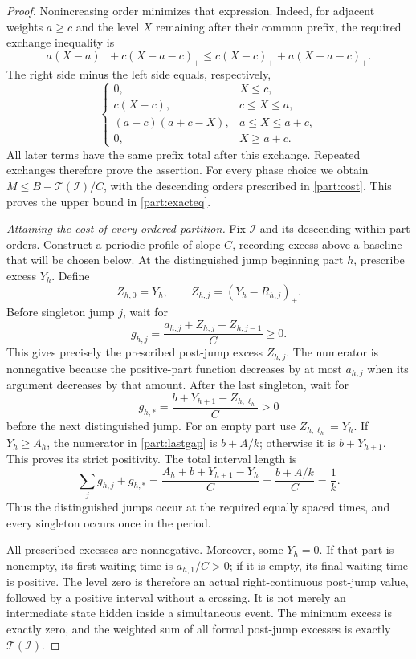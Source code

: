 \documentclass[11pt,a4paper]{article}
\theoremstyle{remark}\newtheorem{remark}[theorem]{Remark}
\begin{document}
\begin{proof}
Nonincreasing order minimizes that expression.  Indeed, for adjacent
weights $a\ge c$ and the level $X$ remaining after their common
prefix, the required exchange inequality is
\begin{equation}\label{part:exchange}
 a(X-a)_++c(X-a-c)_+
 \le c(X-c)_++a(X-a-c)_+.
\end{equation}
The right side minus the left side equals, respectively,
\[
 \begin{cases}
 0,&X\le c,\\
 c(X-c),&c\le X\le a,\\
 (a-c)(a+c-X),&a\le X\le a+c,\\
 0,&X\ge a+c.
 \end{cases}
\]
All later terms have the same prefix total after this exchange.
Repeated exchanges therefore prove the assertion.  For every phase
choice we obtain $M\le B-\mathcal T(\mathcal I)/C$, with the
descending orders prescribed in \eqref{part:cost}.  This proves
the upper bound in \eqref{part:exacteq}.

\emph{Attaining the cost of every ordered partition.}
Fix $\mathcal I$ and its descending within-part orders.  Construct a
periodic profile of slope $C$, recording excess above a baseline
that will be chosen below.  At the distinguished jump beginning
part $h$, prescribe excess $Y_h$.  Define
\[
 Z_{h,0}=Y_h,\qquad Z_{h,j}=(Y_h-R_{h,j})_+.
\]
Before singleton jump $j$, wait for
\begin{equation}\label{part:gaps}
 g_{h,j}=\frac{a_{h,j}+Z_{h,j}-Z_{h,j-1}}C\ge0.
\end{equation}
This gives precisely the prescribed post-jump excess $Z_{h,j}$.
The numerator is nonnegative because the positive-part function
decreases by at most $a_{h,j}$ when its argument decreases by that
amount.  After the last singleton, wait for
\begin{equation}\label{part:lastgap}
 g_{h,*}=\frac{b+Y_{h+1}-Z_{h,\ell_h}}C>0
\end{equation}
before the next distinguished jump.  For an empty part use
$Z_{h,\ell_h}=Y_h$.  If $Y_h\ge A_h$, the numerator in
\eqref{part:lastgap} is $b+A/k$; otherwise it is $b+Y_{h+1}$.
This proves its strict positivity.  The total interval length is
\[
 \sum_jg_{h,j}+g_{h,*}
 =\frac{A_h+b+Y_{h+1}-Y_h}{C}
 =\frac{b+A/k}{C}=\frac1k.
\]
Thus the distinguished jumps occur at the required equally spaced
times, and every singleton occurs once in the period.

All prescribed excesses are nonnegative.  Moreover, some $Y_h=0$.
If that part is nonempty, its first waiting time is
$a_{h,1}/C>0$; if it is empty, its final waiting time is positive.
The level zero is therefore an actual right-continuous post-jump
value, followed by a positive interval without a crossing.  It is
not merely an intermediate state hidden inside a simultaneous
event.  The minimum excess is exactly zero, and the weighted sum
of all formal post-jump excesses is exactly $\mathcal T(\mathcal I)$.


\end{proof}
\end{document}
